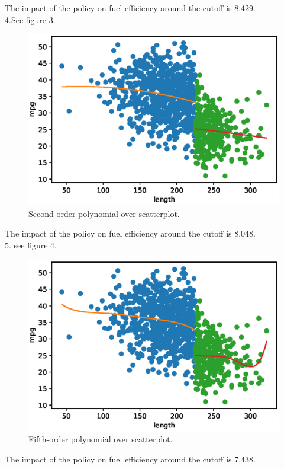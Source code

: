 \documentclass{article}
\begin{document}
The impact of the policy on fuel efficiency around the cutoff is 8.429.\\

4.See figure 3.
\begin{figure}[h]
    \centering
    \includegraphics[scale = 0.7]{figure3.eps}
    \caption{Second-order polynomial over scatterplot.}
\end{figure}

 The impact of the policy on fuel efficiency around the cutoff is 8.048.\\

5. see figure 4.
\begin{figure}[H]
    \centering
    \includegraphics[scale = 0.7]{figure4.eps}
    \caption{Fifth-order polynomial over scatterplot.}
\end{figure}

The impact of the policy on fuel efficiency around the cutoff is 7.438.\\
\end{document}
